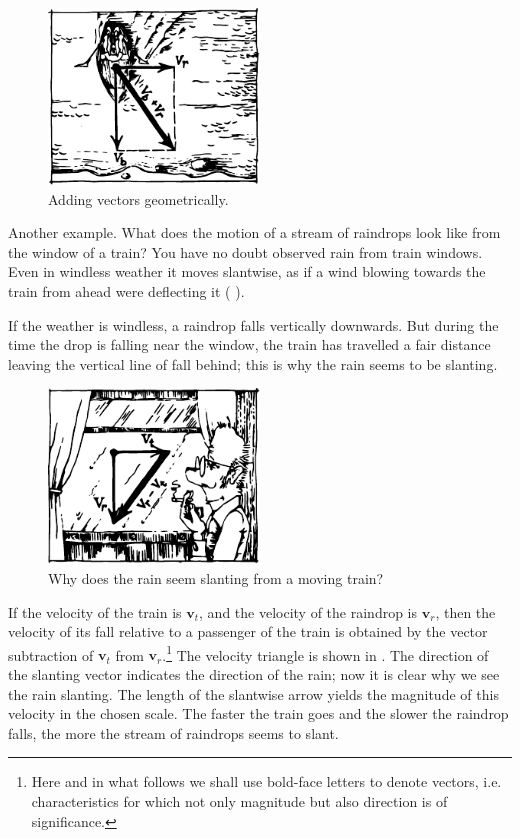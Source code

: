 \begin{figure}
\centering
\includegraphics[width=0.5\textwidth]{figures/fig-01-05.pdf}
\caption{Adding vectors geometrically.}
\label{fig-1.5}
\end{figure}

Another example. What does the motion of a stream of raindrops look
like from the window of a train?  You have no doubt observed rain from
train windows. Even in windless weather it moves slantwise, as if a
wind blowing towards the train from ahead were deflecting it (
).  

If the weather is windless, a raindrop falls vertically
downwards. But during the time the drop is falling near the window,
the train has travelled a fair distance leaving the vertical line of
fall behind; this is why the rain seems to be slanting.
\begin{figure}[!ht]
\centering
\includegraphics[width=0.5\textwidth]{figures/fig-01-06.pdf}
\caption{Why does the rain seem slanting from a moving train?}
\label{fig-1.6}
\end{figure}

If the velocity of the train is $\mathbf{v}_{t}$, and the velocity of
the raindrop is $\mathbf{v}_{r}$, then the velocity of its fall
relative to a passenger of the train is obtained by the vector
subtraction of $\mathbf{v}_{t}$ from $\mathbf{v}_{r}$.\footnote{Here
  and in what follows we shall use bold-face letters to denote
  vectors, i.e. characteristics for which not only magnitude but also
  direction is of significance.} The velocity triangle is shown in
. The direction of the slanting
vector indicates the direction of the rain; now it is clear why we
see the rain slanting. The length of the slantwise arrow yields the
magnitude of this velocity in the chosen scale. The faster the train
goes and the slower the raindrop falls, the more the stream of
raindrops seems to slant.
